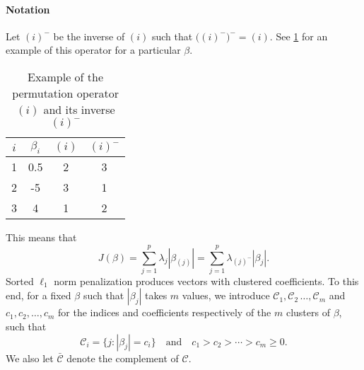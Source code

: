\paragraph{Notation}\label{sec:notation}

Let \((i)^{-}\) be the inverse of \((i)\) such that
\(\big((i)^-\big)^- = (i)\). See \cref{tab:permutation-example} for an
example of this operator for a particular \(\beta\).
\begin{table}
  \centering
  \caption{Example of the permutation operator \((i)\) and its inverse
    \((i)^-\)\label{tab:permutation-example}}
  \begin{tabular}{cccc}
    \toprule
    \(i\) & \(\beta_i\) & \((i)\) & \((i)^-\) \\
    \midrule
    1     & 0.5       & 2              & 3                \\
    2     & -5        & 3              & 1                \\
    3     & 4         & 1              & 2                \\
    \bottomrule
  \end{tabular}
\end{table}
This means that
\[
  J(\beta) = \sum_{j=1}^p \lambda_j |\beta_{(j)}|
  = \sum_{j=1}^p \lambda_{(j)^-}|\beta_j|.
\]
Sorted $\ell_1$ norm penalization produces vectors with clustered coefficients.
To this end, for a fixed $\beta$ such that $|\beta_j|$ takes $m$ values, we introduce \(\mathcal{C}_1, \mathcal{C}_2\, \dots, \mathcal{C}_m\) and \(c_1,
c_2, \dots, c_m\) for the indices and coefficients respectively of the \(m\)
clusters of $\beta$, such that
\[
  \mathcal{C}_i = \{j : |\beta_j| = c_i\} \quad \text{and} \quad
  c_1 > c_2 > \cdots > c_m \geq 0.
\]
We also let \(\bar{\mathcal{C}}\) denote the complement of \(\mathcal{C}\).

